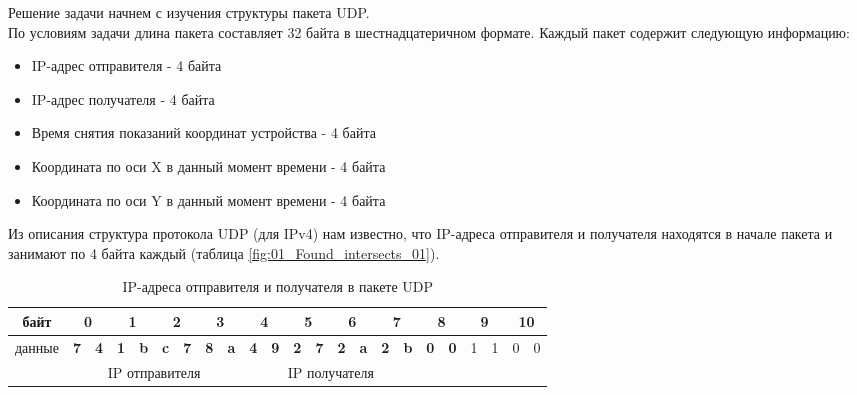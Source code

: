 \solutionSection

Решение задачи начнем с изучения структуры пакета UDP.\\
По условиям задачи длина пакета составляет 32 байта в шестнадцатеричном формате.
Каждый пакет содержит следующую информацию:
\begin{itemize}
	\item IP-адрес отправителя - 4 байта
	\item IP-адрес получателя - 4 байта
	\item Время снятия показаний координат устройства - 4 байта
	\item Координата по оси X в данный момент времени - 4 байта
	\item Координата по оси Y в данный момент времени - 4 байта
\end{itemize}

Из описания структура протокола UDP (для IPv4) нам известно, что IP-адреса отправителя и получателя находятся в начале пакета и занимают по 4 байта каждый (таблица \ref{fig:01_Found_intersects_01}).

\begin{table}[H]
	\begin{center}
		\begin{tabular}{|c|c|c|c|c|c|c|c|c|c|c|c|c|c|c|c|c|c|c|c|c|c|c|}
			\hline
			байт   & \multicolumn{2}{c|}{0}  & \multicolumn{2}{c|}{1}  & \multicolumn{2}{c|}{2}  & \multicolumn{2}{c|}{3}  & \multicolumn{2}{c|}{4}  & \multicolumn{2}{c|}{5}  & \multicolumn{2}{c|}{6}  & \multicolumn{2}{c|}{7}  & \multicolumn{2}{c|}{8}  & \multicolumn{2}{c|}{9} & \multicolumn{2}{c|}{10} \\ \hline
			данные & \textbf{7} & \textbf{4} & \textbf{1} & \textbf{b} & \textbf{c} & \textbf{7} & \textbf{8} & \textbf{a} & \textbf{4} & \textbf{9} & \textbf{2} & \textbf{7} & \textbf{2} & \textbf{a} & \textbf{2} & \textbf{b} & \textbf{0} & \textbf{0} & 1          & 1         & 0          & 0          \\ \hline
			& \multicolumn{8}{c|}{IP отправителя}                                                                   & \multicolumn{8}{c|}{IP получателя}                                                                    &            &            &            &           &            &            \\ \hline
		\end{tabular}
		\label{table:01_Found_intersects_01}
		\caption{IP-адреса отправителя и получателя в пакете UDP}
	\end{center}
\end{table}

